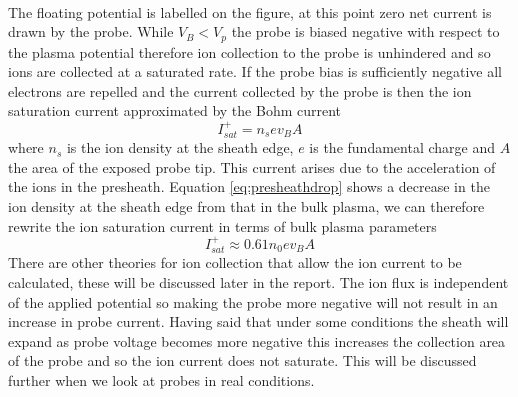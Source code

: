 \documentclass[12pt]{article}
\def\be{\begin{equation}}
\def\ee{\end{equation}}
\begin{document}

\paragraph{}
The floating potential is labelled on the figure, at this point zero net current is drawn by the probe. While $V_B < V_{p}$ the probe is biased negative with respect to the plasma potential therefore ion collection to the probe is unhindered and so ions are collected at a saturated rate. If the probe bias is sufficiently negative all electrons are repelled and the current collected by the probe is then the ion saturation current approximated by the Bohm current 
\be 
I^{+}_{sat} = n_s e v_B A 
\label{eq:isat}
\ee
where $n_s$ is the ion density at the sheath edge, $e$ is the fundamental charge and $A$ the area of the exposed probe tip. This current arises due to the acceleration of the ions in the presheath. Equation \eqref{eq:presheathdrop} shows a decrease in the ion density at the sheath edge from that in the bulk plasma, we can therefore rewrite the ion saturation current in terms of bulk plasma parameters
\be
I^{+}_{sat} \approx 0.61 n_0 e v_B A
\ee
There are other theories for ion collection that allow the ion current to be calculated, these will be discussed later in the report. 
The ion flux is independent of the applied potential so making the probe more negative will not result in an increase in probe current. Having said that under some conditions the sheath will expand as probe voltage becomes more negative this increases the collection area of the probe and so the ion current does not saturate. This will be discussed further when we look at probes in real conditions.
\end{document}
